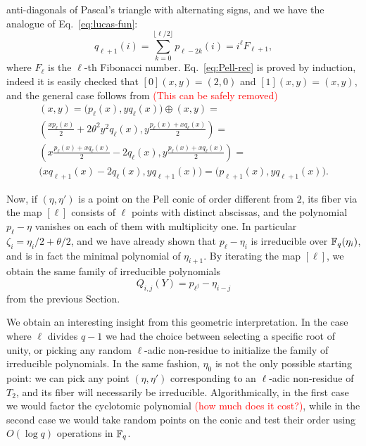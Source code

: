 \documentclass{sig-alternate}
\newcommand{\todo}[1]{\textcolor{red}{(#1)}}
\begin{document}
anti-diagonals of Pascal's triangle with alternating signs, and we
have the analogue of Eq.~\eqref{eq:lucas-fun}:
\begin{equation}
  \label{eq:fibonacci-fun}
  q_{\ell+1}(i) = \sum_{k=0}^{\lfloor\ell/2\rfloor} p_{\ell-2k}(i) = 
  i^\ell F_{\ell+1},
\end{equation}
where $F_\ell$ is the $\ell$-th Fibonacci
number. Eq.~\eqref{eq:Pell-rec} is proved by induction, indeed it is
easily checked that $[0](x,y) = (2,0)$ and $[1](x,y)=(x,y)$, and the
general case follows from \todo{This can be safely removed}
\begin{multline}
  [\ell+1](x,y) = \bigl(p_\ell(x), yq_\ell(x)\bigr) \oplus (x,y) =\\
  \left(\frac{xp_\ell(x)}{2} + 2\theta^2y^2q_\ell(x),
    y\frac{p_{\ell}(x) + xq_\ell(x)}{2}\right) =\\
  \left(x\frac{p_\ell(x) + xq_\ell(x)}{2} - 2q_\ell(x),
    y\frac{p_{\ell}(x) + xq_\ell(x)}{2}\right) =\\
  \bigl(xq_{\ell+1}(x) - 2q_\ell(x), yq_{\ell+1}(x)\bigr) = 
  \bigl(p_{\ell+1}(x), yq_{\ell+1}(x)\bigr).
\end{multline}

Now, if $(\eta,\eta')$ is a point on the Pell conic of order different
from $2$, its fiber via the map $[\ell]$ consists of $\ell$ points
with distinct abscissas, and the polynomial $p_\ell-\eta$ vanishes on
each of them with multiplicity one. In particular $\zeta_i =
\eta_i/2+\theta/2$, and we have already shown that $p_\ell-\eta_i$ is
irreducible over $\mathbb{F}_q(\eta_i)$, and is in fact the minimal polynomial
of $\eta_{i+1}$.  By iterating the map $[\ell]$, we obtain the same
family of irreducible polynomials
\begin{equation}
  Q_{i,j}(Y) = p_{\ell^j}-\eta_{i-j}
\end{equation}
from the previous Section.

We obtain an interesting insight from this geometric
interpretation. In the case where $\ell$ divides $q-1$ we had the
choice between selecting a specific root of unity, or picking any
random $\ell$-adic non-residue to initialize the family of irreducible
polynomials. In the same fashion, $\eta_0$ is not the only possible
starting point: we can pick any point $(\eta,\eta')$ corresponding to
an $\ell$-adic non-residue of $T_2$, and its fiber will necessarily be
irreducible. Algorithmically, in the first case we would factor the
cyclotomic polynomial \todo{how much does it cost?}, while in the
second case we would take random points on the conic and test their
order using $O(\log q)$ operations in $\mathbb{F}_q$.
\end{document}
